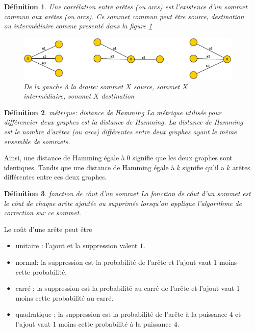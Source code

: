 \documentclass[onecolumn, 12pt]{book}
\newtheorem{definition}{D\'efinition}
\begin{document}
\begin{definition}
Une corr\'elation entre ar\^etes (ou arcs) est l'existence d'un sommet commun aux ar\^etes (ou arcs). Ce sommet commun peut \^etre source, destination ou interm\'ediaire comme present\'e dans la figure \ref{typeSommetEnCommun}
\begin{centering} 
\begin{figure}[htb!] 
\includegraphics[scale=0.50]{images/typeSommetsEnCommun.eps}
\caption{De la gauche \`a la droite: sommet $X$ source, sommet $X$ interm\'ediaire, sommet $X$ destination}
\label{typeSommetEnCommun} 
\end{figure}
\end{centering} 
\end{definition}

\begin{definition}{ m\'etrique: distance de Hamming} \newline
La m\'etrique utilis\'ee pour diff\'erencier deux graphes est la {\em distance de Hamming}.
La distance de Hamming est le nombre d'ar\^etes (ou arcs) diff\'erentes entre deux graphes ayant le m\^eme ensemble de sommets. 
\end{definition}
Ainsi, une distance de Hamming \'egale \`a $0$ signifie que les deux graphes sont identiques. Tandis que  une distance de Hamming \'egale \`a $k$ signifie qu'il a $k$ ar\^etes diff\'erentes entre ces deux graphes.

\begin{definition}{ fonction de c\^out d'un sommet} \newline
La fonction de c\^out d'un sommet est le c\^out de chaque ar\^ete ajout\'ee ou supprim\'ee lorsqu'on applique l'algorithme de correction sur ce sommet.
\end{definition}
Le co\^ut d'une ar\^ete peut \^etre
\begin{itemize}
	\item unitaire : l'ajout et la suppression valent $1$.
	\item normal: la suppression est la probabilit\'e de l'ar\^ete et l'ajout vaut  $1$ moins cette probabilit\'e.
	\item carr\'e : la suppression est la probabilit\'e au carr\'e de l'ar\^ete et l'ajout vaut  $1$ moins cette probabilit\'e au carr\'e.
	\item quadratique :  la suppression est la probabilit\'e de l'ar\^ete \`a la puissance $4$ et l'ajout vaut  $1$ moins cette probabilit\'e \`a la puissance $4$.
\end{itemize}
\end{document}
